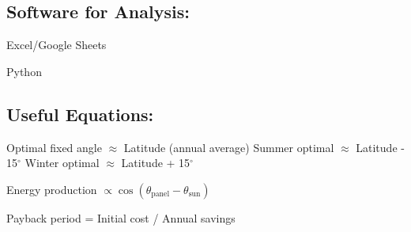\documentclass[11pt,twoside]{article}
\numberwithin{equation}{section}
\newcommand{\?}{\stackrel{?}{=}}
\begin{document}
\subsection*{Software for Analysis:}
\begin{compactitem}
    \item Excel/Google Sheets 
    \item Python 
\end{compactitem}

\subsection*{Useful Equations:}
\begin{calculationbox}
Optimal fixed angle $\approx$ Latitude (annual average)
Summer optimal $\approx$  Latitude - 15$^\circ$
Winter optimal $\approx$  Latitude + 15$^\circ$

Energy production  $\propto \cos(\theta_{\text{panel}} - \theta_{\text{sun}})$

Payback period = Initial cost / Annual savings
\end{calculationbox}
\end{document}
